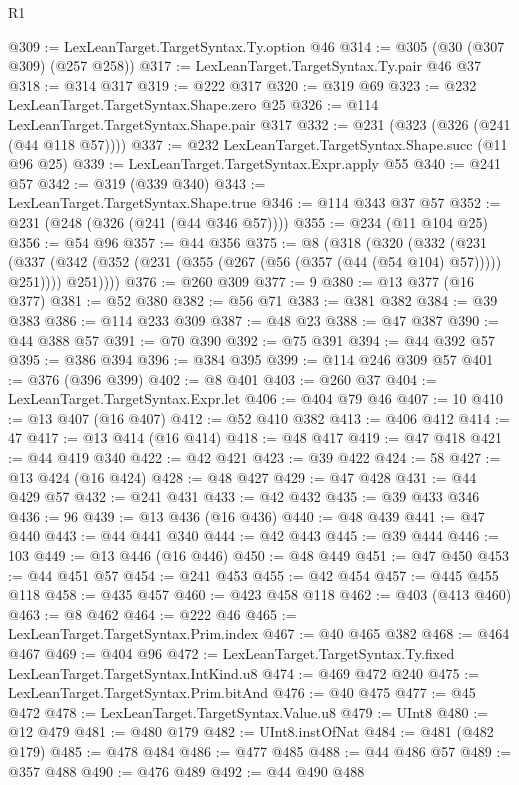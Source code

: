 \begin{lexlean}{R1}
\begin{coremodule}
{{{{{{{{{{{{{{{{{{{{{{{@309 := LexLeanTarget.TargetSyntax.Ty.option @46
@314 := @305 (@30 (@307 @309) (@257 @258))
@317 := LexLeanTarget.TargetSyntax.Ty.pair @46 @37
@318 := @314 @317
@319 := @222 @317
@320 := @319 @69
@323 := @232 LexLeanTarget.TargetSyntax.Shape.zero @25
@326 := @114 LexLeanTarget.TargetSyntax.Shape.pair @317
@332 := @231 (@323 (@326 (@241 (@44 @118 @57))))
@337 := @232 LexLeanTarget.TargetSyntax.Shape.succ (@11 @96 @25)
@339 := LexLeanTarget.TargetSyntax.Expr.apply @55
@340 := @241 @57
@342 := @319 (@339 @340)
@343 := LexLeanTarget.TargetSyntax.Shape.true
@346 := @114 @343 @37 @57
@352 := @231 (@248 (@326 (@241 (@44 @346 @57))))
@355 := @234 (@11 @104 @25)
@356 := @54 @96
@357 := @44 @356
@375 := @8
    (@318
      (@320
        (@332
          (@231
            (@337 (@342 (@352 (@231 (@355 (@267 (@56 (@357 (@44 (@54 @104) @57))))) @251))))
            @251))))
@376 := @260 @309
@377 := 9
@380 := @13 @377 (@16 @377)
@381 := @52 @380
@382 := @56 @71
@383 := @381 @382
@384 := @39 @383
@386 := @114 @233 @309
@387 := @48 @23
@388 := @47 @387
@390 := @44 @388 @57
@391 := @70 @390
@392 := @75 @391
@394 := @44 @392 @57
@395 := @386 @394
@396 := @384 @395
@399 := @114 @246 @309 @57
@401 := @376 (@396 @399)
@402 := @8 @401
@403 := @260 @37
@404 := LexLeanTarget.TargetSyntax.Expr.let
@406 := @404 @79 @46
@407 := 10
@410 := @13 @407 (@16 @407)
@412 := @52 @410 @382
@413 := @406 @412
@414 := 47
@417 := @13 @414 (@16 @414)
@418 := @48 @417
@419 := @47 @418
@421 := @44 @419 @340
@422 := @42 @421
@423 := @39 @422
@424 := 58
@427 := @13 @424 (@16 @424)
@428 := @48 @427
@429 := @47 @428
@431 := @44 @429 @57
@432 := @241 @431
@433 := @42 @432
@435 := @39 @433 @346
@436 := 96
@439 := @13 @436 (@16 @436)
@440 := @48 @439
@441 := @47 @440
@443 := @44 @441 @340
@444 := @42 @443
@445 := @39 @444
@446 := 103
@449 := @13 @446 (@16 @446)
@450 := @48 @449
@451 := @47 @450
@453 := @44 @451 @57
@454 := @241 @453
@455 := @42 @454
@457 := @445 @455 @118
@458 := @435 @457
@460 := @423 @458 @118
@462 := @403 (@413 @460)
@463 := @8 @462
@464 := @222 @46
@465 := LexLeanTarget.TargetSyntax.Prim.index
@467 := @40 @465 @382
@468 := @464 @467
@469 := @404 @96
@472 := LexLeanTarget.TargetSyntax.Ty.fixed LexLeanTarget.TargetSyntax.IntKind.u8
@474 := @469 @472 @240
@475 := LexLeanTarget.TargetSyntax.Prim.bitAnd
@476 := @40 @475
@477 := @45 @472
@478 := LexLeanTarget.TargetSyntax.Value.u8
@479 := UInt8
@480 := @12 @479
@481 := @480 @179
@482 := UInt8.instOfNat
@484 := @481 (@482 @179)
@485 := @478 @484
@486 := @477 @485
@488 := @44 @486 @57
@489 := @357 @488
@490 := @476 @489
@492 := @44 @490 @488
}}}}}}}}}}}}}}}}}}}}}}}
\end{coremodule}
\end{lexlean}
